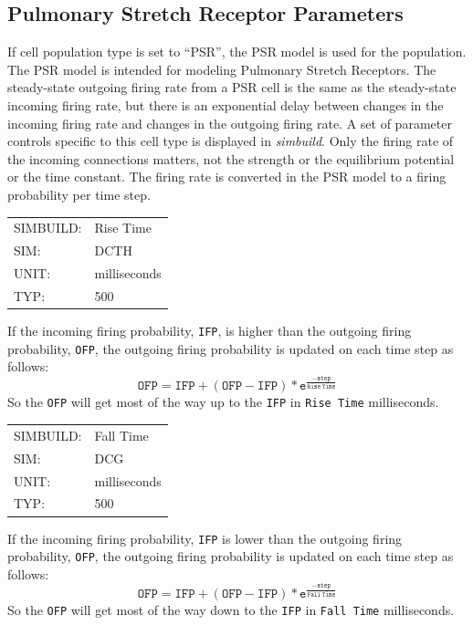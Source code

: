 \documentclass[12pt,openany,oneside]{book}
\newcommand{\ticode}[1]{\texttt{#1}}
\newcommand{\tmcode}[1]{\mathtt{#1}}
\newcommand{\prog}[1]{\textit{{#1}}}
\newcommand{\inquotes}[1]{{{``#1''}}}
\begin{document}
\subsection{Pulmonary Stretch Receptor Parameters}
\label{PSR Parameters}
If cell population type is set to \inquotes{PSR}, the PSR 
model is used for the population.  The PSR model is
intended for modeling Pulmonary Stretch Receptors. The steady-state
outgoing firing rate from a PSR cell is the same as the steady-state
incoming firing rate, but there is an exponential delay between
changes in the incoming firing rate and changes in the outgoing firing
rate.  A set of parameter controls specific to this cell type is displayed
in \prog{simbuild}.  Only the firing rate of the incoming connections matters, not
the strength or the equilibrium potential or the time constant. The
firing rate is converted in the PSR model to a firing probability per
time step.

\begin{flushleft}
\begin{tabular}{@{}ll@{}}
SIMBUILD: & Rise Time\\
SIM: & DCTH\\
UNIT: & milliseconds\\
TYP: & 500\\
\end{tabular}
\end{flushleft}
\noindent
If the incoming firing probability, \ticode{IFP}, is higher than the outgoing
firing probability, \ticode{OFP}, the outgoing firing probability is updated
on each time step as follows:
$$
\tmcode{OFP = IFP + (OFP - IFP) * e^{\tfrac{-step}{Rise\ Time}}}
$$
So the \ticode{OFP} will get most of the way up to the
\ticode{IFP} in \ticode{Rise Time} milliseconds.
\filbreak
\vspace{\baselineskip}

\begin{flushleft}
\begin{tabular}{@{}ll@{}}
SIMBUILD: & Fall Time\\
SIM: & DCG\\
UNIT: & milliseconds\\
TYP: & 500\\
\end{tabular}
\end{flushleft}
\noindent
If the incoming firing probability, \ticode{IFP} is lower than the outgoing
firing probability, \ticode{OFP}, the outgoing firing probability is updated
on each time step as follows: 
$$
\tmcode{OFP = IFP + (OFP - IFP) * e^{\tfrac{-step}{Fall\ Time}}}
$$
So the \ticode{OFP} will get most of the way down to the \ticode{IFP} in
\ticode{Fall Time} milliseconds.
\filbreak
\vspace{\baselineskip}
\end{document}
